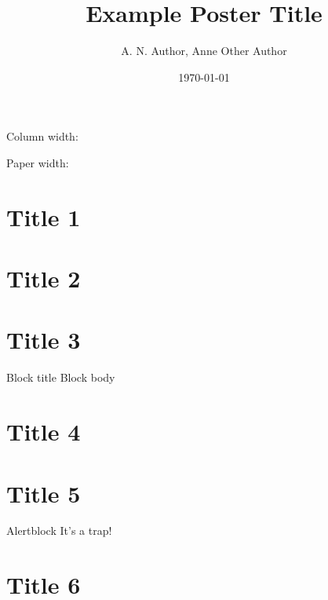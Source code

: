 \documentclass{beamer}
\title{Example Poster Title}
\author{A. N. Author, Anne Other Author}
\institute{School of Hard Knocks}
\date{\today}
\begin{document}
\justify
\begin{frame}[t]
  \maketitle

  \vspace*{1cm}
\begin{postercolumn}{0.0167}
  Column width: \printlen[5][in]{\textwidth}

  Paper width: \printlen[5][in]{\paperwidth}
  \section{Title 1}
  \lipsum[1]

  \section{Title 2}
  \lipsum[2]
  
\end{postercolumn}

\begin{postercolumn}{0.3467}
  \section{Title 3}
  \begin{block}{Block title}
    Block body
  \end{block}
    \lipsum[3]

    \section{Title 4}
    \lipsum[4]
\end{postercolumn}


\begin{postercolumn}{0.6767}
  \section{Title 5}
  \begin{alertblock}{Alertblock}
    It's a trap!
  \end{alertblock}
  \lipsum[5]

  \section{Title 6}
  \lipsum[6]
\end{postercolumn}

\end{frame}
\end{document}
